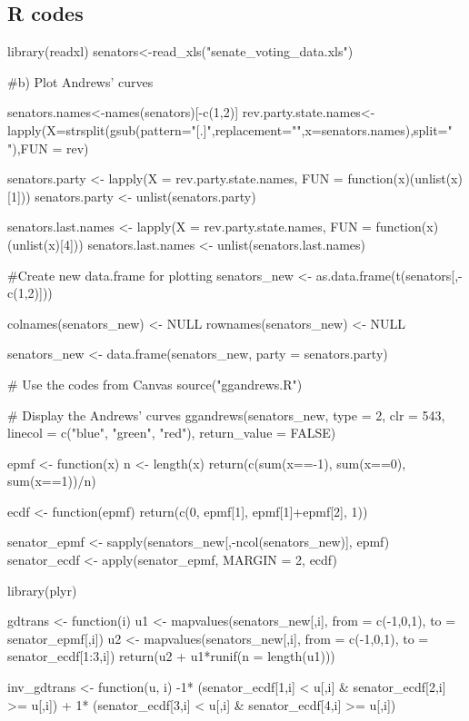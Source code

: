 \documentclass{article}
\theoremstyle{definition}
\begin{document}
    
	
\newpage
\appendix
	\begin{appendices}
	\section{R codes}
	\begin{rcode}
library(readxl)
senators<-read_xls("senate_voting_data.xls")

#b) Plot Andrews' curves

senators.names<-names(senators)[-c(1,2)]
rev.party.state.names<-lapply(X=strsplit(gsub(pattern="[.]",replacement="",x=senators.names),split=" "),FUN = rev)

senators.party <- lapply(X = rev.party.state.names, FUN = function(x)(unlist(x)[1]))
senators.party <- unlist(senators.party)

senators.last.names <- lapply(X = rev.party.state.names, FUN = function(x)(unlist(x)[4]))
senators.last.names <- unlist(senators.last.names)


#Create new data.frame for plotting
senators_new <- as.data.frame(t(senators[,-c(1,2)]))

colnames(senators_new) <- NULL
rownames(senators_new) <- NULL

senators_new <- data.frame(senators_new, party = senators.party)


# Use the codes from Canvas
source("ggandrews.R")

# Display the Andrews' curves
ggandrews(senators_new, type = 2, clr = 543, linecol = c("blue", "green", "red"), return_value = FALSE)


epmf <- function(x){
  n <- length(x)
  return(c(sum(x==-1), sum(x==0), sum(x==1))/n)
}

ecdf <- function(epmf){
  return(c(0, epmf[1], epmf[1]+epmf[2], 1))
}

senator_epmf <- sapply(senators_new[,-ncol(senators_new)], epmf)
senator_ecdf <- apply(senator_epmf, MARGIN = 2, ecdf)

library(plyr)

gdtrans <- function(i){
  u1 <- mapvalues(senators_new[,i], from = c(-1,0,1), to = senator_epmf[,i])
  u2 <- mapvalues(senators_new[,i], from = c(-1,0,1), to = senator_ecdf[1:3,i])
  return(u2 + u1*runif(n = length(u1)))
}

inv_gdtrans <- function(u, i){
  -1* (senator_ecdf[1,i] < u[,i] & senator_ecdf[2,i] >= u[,i]) + 1* (senator_ecdf[3,i] < u[,i] & senator_ecdf[4,i] >= u[,i])
}


\end{rcode}
\end{appendices}
\end{document}

